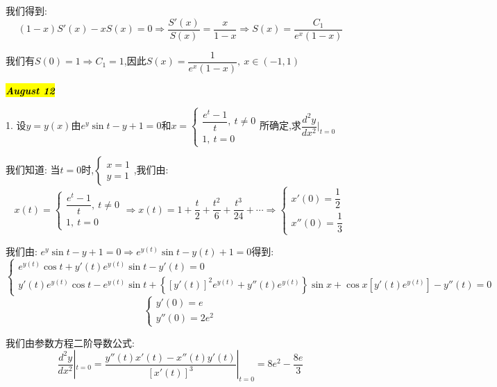 \begin{solution}
	我们得到:  
	$$(1-x)S'(x)-xS(x)=0\Rightarrow \dfrac{S'(x)}{S(x)}=\dfrac{x}{1-x}\Rightarrow S(x)=\dfrac{C_{1}}{e^x(1-x)}$$
	
	我们有$S(0)=1\Rightarrow C_{1}=1$,因此$S(x)=\dfrac{1}{e^x(1-x)},\ x\in(-1,1)$
	
\end{solution}

\hl{\textbf{\textit{August 12}}}

1. 设$y=y(x)$由$e^y\sin t-y+1=0$和$x=\left\lbrace
\begin{array}{l}
	\dfrac{e^t-1}{t},\ t\neq 0\\
	1,\ t=0
\end{array}
\right. $所确定,求$\dfrac{d^2y}{dx^2}|_{t=0}$
\begin{solution}

	我们知道:  当$t=0$时,$\left\lbrace
	\begin{array}{l}
		x=1\\y=1
	\end{array}
	\right. $,我们由:  
	$$x(t)=\left\lbrace
	\begin{array}{l}
		\dfrac{e^t-1}{t},\ t\neq 0\\
		1,\ t=0
	\end{array}
	\right. \Rightarrow x(t)=1+\dfrac{t}{2}+\dfrac{t^2}{6}+\dfrac{t^3}{24}+\cdots\Rightarrow \left\lbrace
	\begin{array}{l}
		x'(0)=\dfrac{1}{2}\\
		x''(0)=\dfrac{1}{3}
	\end{array}
	\right. $$
	
	我们由:  $e^y\sin t-y+1=0\Rightarrow e^{y(t)}\sin t-y(t)+1=0$得到:  
	$$\left\lbrace
	\begin{array}{l}
		e^{y(t)}\cos t+y'(t)e^{y(t)}\sin t-y'(t)=0\\
		y'(t)e^{y(t)}\cos t-e^{y(t)}\sin t+\left\lbrace [y'(t)]^2e^{y(t)}+y''(t)e^{y(t)}\right\rbrace \sin x+\cos x\left[y'(t)e^{y(t)} \right]-y''(t)=0
	\end{array}
	\right.$$
	$$\left\lbrace
	\begin{array}{l}
		y'(0)=e\\
		y''(0)=2e^2
	\end{array}
	\right. $$
	
	我们由参数方程二阶导数公式:  
	$$\dfrac{d^2y}{dx^2}|_{t=0}=\dfrac{y''(t)x'(t)-x''(t)y'(t)}{[x'(t)]^3}|_{t=0}=8e^2-\dfrac{8e}{3}$$
	
\end{solution}

